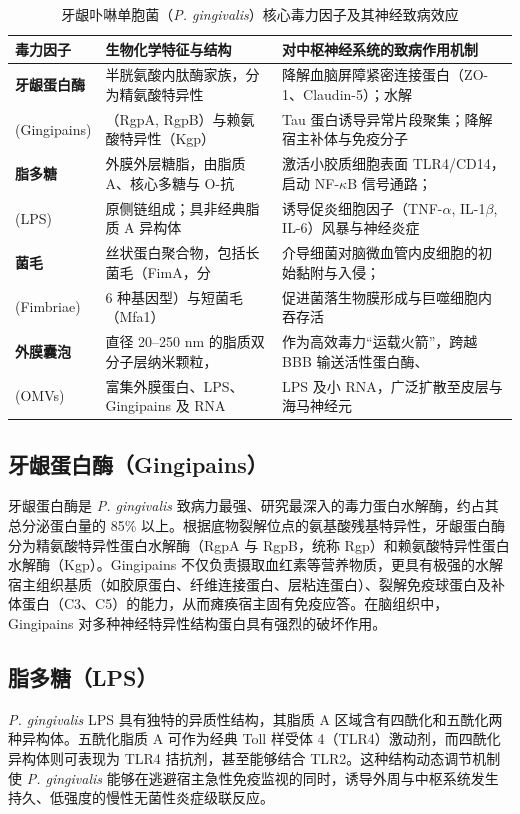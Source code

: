 \documentclass[12pt,a4paper]{ctexart}
\begin{document}
\begin{table}[htbp]
\centering
\small
\caption{牙龈卟啉单胞菌（\textit{P. gingivalis}）核心毒力因子及其神经致病效应}
\label{tab:virulence}
\begin{tabular}{lp{6.2cm}p{6.8cm}}
\toprule
\textbf{毒力因子} & \textbf{生物化学特征与结构} & \textbf{对中枢神经系统的致病作用机制} \\
\midrule
\textbf{牙龈蛋白酶} & 半胱氨酸内肽酶家族，分为精氨酸特异性 & 降解血脑屏障紧密连接蛋白（ZO-1、Claudin-5）；水解 \\
(Gingipains) & （RgpA, RgpB）与赖氨酸特异性（Kgp） & Tau 蛋白诱导异常片段聚集；降解宿主补体与免疫分子 \\
\midrule
\textbf{脂多糖} & 外膜外层糖脂，由脂质 A、核心多糖与 O-抗 & 激活小胶质细胞表面 TLR4/CD14，启动 NF-$\kappa$B 信号通路； \\
(LPS) & 原侧链组成；具非经典脂质 A 异构体 & 诱导促炎细胞因子（TNF-$\alpha$, IL-1$\beta$, IL-6）风暴与神经炎症 \\
\midrule
\textbf{菌毛} & 丝状蛋白聚合物，包括长菌毛（FimA，分 & 介导细菌对脑微血管内皮细胞的初始黏附与入侵； \\
(Fimbriae) & 6 种基因型）与短菌毛（Mfa1） & 促进菌落生物膜形成与巨噬细胞内吞存活 \\
\midrule
\textbf{外膜囊泡} & 直径 20--250 nm 的脂质双分子层纳米颗粒， & 作为高效毒力“运载火箭”，跨越 BBB 输送活性蛋白酶、 \\
(OMVs) & 富集外膜蛋白、LPS、Gingipains 及 RNA & LPS 及小 RNA，广泛扩散至皮层与海马神经元 \\
\bottomrule
\end{tabular}
\end{table}

\subsection{牙龈蛋白酶（Gingipains）}
牙龈蛋白酶是 \textit{P. gingivalis} 致病力最强、研究最深入的毒力蛋白水解酶，约占其总分泌蛋白量的 85\% 以上。根据底物裂解位点的氨基酸残基特异性，牙龈蛋白酶分为精氨酸特异性蛋白水解酶（RgpA 与 RgpB，统称 Rgp）和赖氨酸特异性蛋白水解酶（Kgp）\cite{dominy2019}。Gingipains 不仅负责摄取血红素等营养物质，更具有极强的水解宿主组织基质（如胶原蛋白、纤维连接蛋白、层粘连蛋白）、裂解免疫球蛋白及补体蛋白（C3、C5）的能力，从而瘫痪宿主固有免疫应答。在脑组织中，Gingipains 对多种神经特异性结构蛋白具有强烈的破坏作用\cite{yuning2018}。

\subsection{脂多糖（LPS）}
\textit{P. gingivalis} LPS 具有独特的异质性结构，其脂质 A 区域含有四酰化和五酰化两种异构体。五酰化脂质 A 可作为经典 Toll 样受体 4（TLR4）激动剂，而四酰化异构体则可表现为 TLR4 拮抗剂，甚至能够结合 TLR2。这种结构动态调节机制使 \textit{P. gingivalis} 能够在逃避宿主急性免疫监视的同时，诱导外周与中枢系统发生持久、低强度的慢性无菌性炎症级联反应\cite{zhangjing2017, ren2024}。
\end{document}
